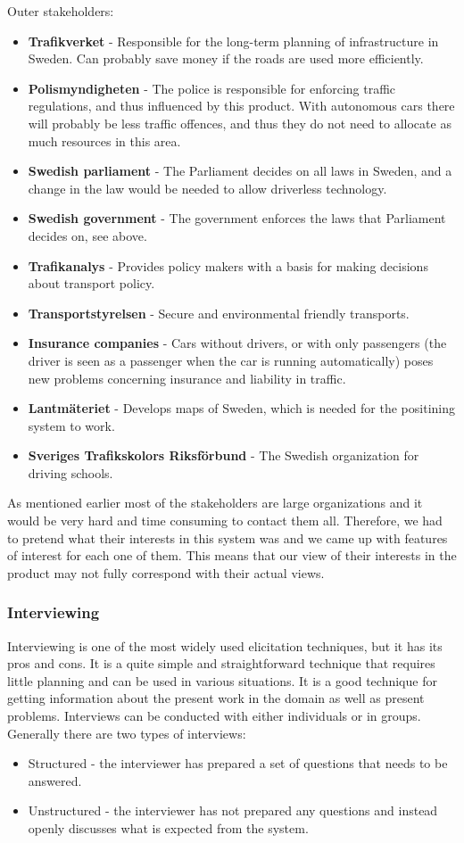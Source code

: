 \documentclass[10pt]{article}
\begin{document}
\noindent Outer stakeholders:
\begin{itemize}
\item \textbf{Trafikverket} - Responsible for the long-term planning of infrastructure in Sweden. Can probably save money if the roads are used more efficiently. 
\item \textbf{Polismyndigheten} - The police is responsible for enforcing traffic regulations, and thus influenced by this product. With autonomous cars there will probably be less traffic offences, and thus they do not need to allocate as much resources in this area. 
\item \textbf{Swedish parliament} - The Parliament decides on all laws in Sweden, and a change in the law would be needed to allow driverless technology.
\item \textbf{Swedish government} - The government enforces the laws that Parliament decides on, see above.
\item \textbf{Trafikanalys} - Provides policy makers with a basis for making decisions about transport policy.
\item \textbf{Transportstyrelsen} - Secure and environmental friendly transports.
\item \textbf{Insurance companies} - Cars without drivers, or with only passengers (the driver is seen as a passenger when the car is running automatically) poses new problems concerning insurance and liability in traffic.
\item \textbf{Lantmäteriet} - Develops maps of Sweden, which is needed for the positining system to work.
\item \textbf{Sveriges Trafikskolors Riksförbund} - The Swedish organization for driving schools.
\end{itemize}
As mentioned earlier most of the stakeholders are large organizations and it would be very hard and time consuming to contact them all. Therefore, we had to pretend what their interests in this system was and we came up with features of interest for each one of them. This means that our view of their interests in the product may not fully correspond with their actual views. 

\subsubsection{Interviewing}
Interviewing is one of the most widely used elicitation techniques, but it has its pros and cons. It is a quite simple and straightforward technique that requires little planning and can be used in various situations. It is a good technique for getting information about the present work in the domain as well as present problems. Interviews can be conducted with either individuals or in groups.
Generally there are two types of interviews: 
\begin{itemize}
    \item Structured - the interviewer has prepared a set of questions that needs to be answered. 
    \item Unstructured - the interviewer has not prepared any questions and instead openly discusses what is expected from the system.
\end{itemize}
\end{document}
